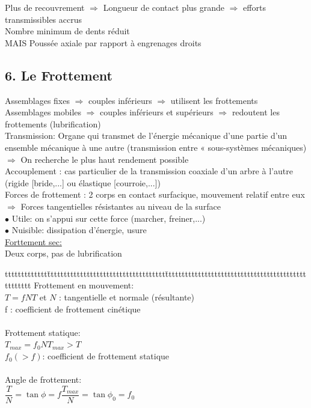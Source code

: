 Plus de recouvrement $\Rightarrow$ Longueur de contact plus grande $\Rightarrow$ efforts transmissibles accrus\\
Nombre minimum de dents réduit\\
{\color{red}MAIS} Poussée axiale par rapport à engrenages droits\\

\subsection*{6. Le Frottement}
Assemblages fixes $\Rightarrow$ couples inférieurs $\Rightarrow$ {\color{orange}utilisent} les frottements\\
Assemblages mobiles $\Rightarrow$ couples inférieurs et supérieurs $\Rightarrow$ {\color{orange}redoutent} les frottements (lubrification)\\

{\color{orange}Transmission}: Organe qui transmet de l’énergie mécanique d’une partie  d’un ensemble mécanique à une autre (transmission entre « sous-systèmes mécaniques)\\
$\Rightarrow$ On recherche le plus haut rendement possible\\
{\color{orange}Accouplement} : cas particulier de la transmission coaxiale d’un arbre à l’autre (rigide [bride,...] ou élastique [courroie,...])\\

Forces de {\color{orange}frottement} : 2 corps en contact surfacique, mouvement relatif entre eux $\Rightarrow$ Forces tangentielles résistantes au niveau de la surface\\
$\bullet$ Utile: on s'appui sur cette force (marcher, freiner,...)\\
$\bullet$ Nuisible: dissipation d'énergie, usure\\

\underline{Forttement sec:}\\
Deux corps, pas de lubrification\\

\begin{bluebox}
\begin{tabbing}
ttttttttttttt\=tttttttttttttttttttttttttttttttttttt\=ttttttttttttttttttttttttttttttttttttttttttttttttttt\kill
Frottement en mouvement: \\
\> $T=fN$\>$T$ et $N$ : tangentielle et normale (résultante)\\
\>\>f : coefficient de frottement {\color{orange}cinétique}\\\\
Frottement statique:\\
\>$T_{max}=f_0N$\>$T_{max}>T$\\
\>\>$f_0 (>f)$: coefficient de frottement {\color{orange}statique}\\\\
Angle de frottement:\\
\> $\dfrac{T}{N}=\tan\phi=f$\>$\dfrac{T_{max}}{N}=\tan\phi_0=f_0$
\end{tabbing}
\end{bluebox}\\\\

